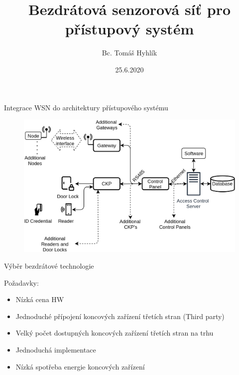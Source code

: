 \documentclass{beamer}
\title{Bezdrátová senzorová síť pro přístupový systém}
\date{25.6.2020}
\author{Bc. Tomáš Hyhlík}
\institute{Diplomová práce}
\begin{document}
  \maketitle

  

	\begin{frame}{Integrace WSN do architektury přístupového systému}

		\begin{figure}[h]
			\centering
			\includegraphics[width=1\textwidth]{ACS_IoT_extension_21}
			\label{fig:ACS architecture IMA with geteway}
		\end{figure}
			
	\end{frame}



  \begin{frame}{Výběr bezdrátové technologie}

	Požadavky:
	\begin{itemize}
		\item Nízká cena HW
		\item Jednoduché přípojení koncových zařízení třetích stran (Third party)
		\item Velký počet dostupných koncových zařízení třetích stran na trhu 
		\item Jednoduchá implementace
		\item Nízká spotřeba energie koncových zařízení
	  \end{itemize}

  \end{frame}
\end{document}
